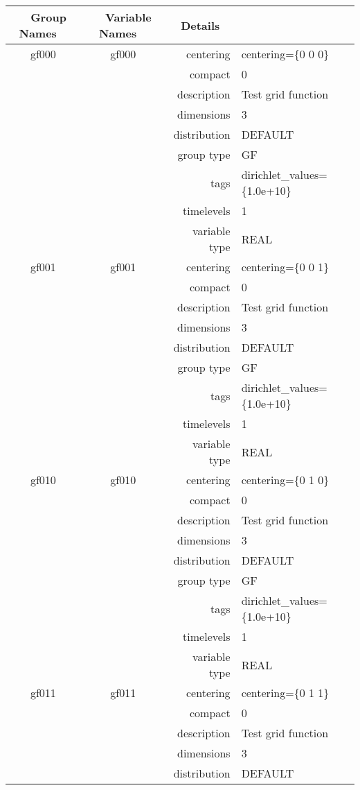\begin{tabular*}{150mm}{|c|c@{\extracolsep{\fill}}|rl|} \hline 
~ {\bf Group Names} ~ & ~ {\bf Variable Names} ~  &{\bf Details} ~ & ~\\ 
\hline 
gf000 & gf000 & centering & centering=\{0 0 0\} \\ 
 &  & compact & 0 \\ 
 &  & description & Test grid function \\ 
 &  & dimensions & 3 \\ 
 &  & distribution & DEFAULT \\ 
 &  & group type & GF \\ 
 &  & tags & dirichlet\_values=\{1.0e+10\} \\ 
 &  & timelevels & 1 \\ 
 &  & variable type & REAL \\ 
\hline 
gf001 & gf001 & centering & centering=\{0 0 1\} \\ 
 &  & compact & 0 \\ 
 &  & description & Test grid function \\ 
 &  & dimensions & 3 \\ 
 &  & distribution & DEFAULT \\ 
 &  & group type & GF \\ 
 &  & tags & dirichlet\_values=\{1.0e+10\} \\ 
 &  & timelevels & 1 \\ 
 &  & variable type & REAL \\ 
\hline 
gf010 & gf010 & centering & centering=\{0 1 0\} \\ 
 &  & compact & 0 \\ 
 &  & description & Test grid function \\ 
 &  & dimensions & 3 \\ 
 &  & distribution & DEFAULT \\ 
 &  & group type & GF \\ 
 &  & tags & dirichlet\_values=\{1.0e+10\} \\ 
 &  & timelevels & 1 \\ 
 &  & variable type & REAL \\ 
\hline 
gf011 & gf011 & centering & centering=\{0 1 1\} \\ 
 &  & compact & 0 \\ 
 &  & description & Test grid function \\ 
 &  & dimensions & 3 \\ 
 &  & distribution & DEFAULT \\ 

\end{tabular*}
